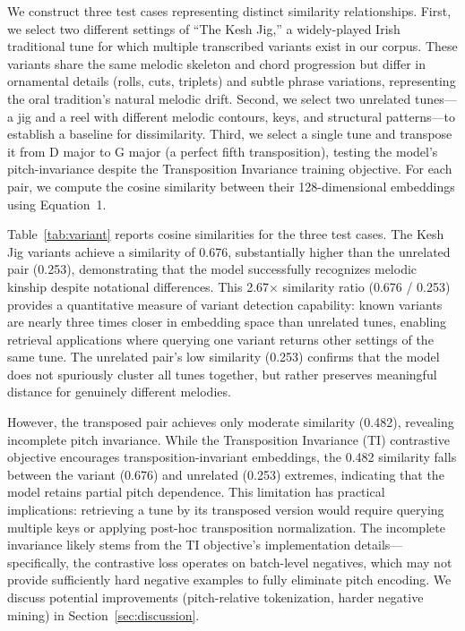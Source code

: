 \documentclass[]{interact}
\theoremstyle{plain}
\theoremstyle{definition}
\theoremstyle{remark}
\begin{document}
We construct three test cases representing distinct similarity relationships. First, we select two different settings of ``The Kesh Jig,'' a widely-played Irish traditional tune for which multiple transcribed variants exist in our corpus. These variants share the same melodic skeleton and chord progression but differ in ornamental details (rolls, cuts, triplets) and subtle phrase variations, representing the oral tradition's natural melodic drift. Second, we select two unrelated tunes---a jig and a reel with different melodic contours, keys, and structural patterns---to establish a baseline for dissimilarity. Third, we select a single tune and transpose it from D major to G major (a perfect fifth transposition), testing the model's pitch-invariance despite the Transposition Invariance training objective. For each pair, we compute the cosine similarity between their 128-dimensional embeddings using Equation~1.

Table~\ref{tab:variant} reports cosine similarities for the three test cases. The Kesh Jig variants achieve a similarity of 0.676, substantially higher than the unrelated pair (0.253), demonstrating that the model successfully recognizes melodic kinship despite notational differences. This 2.67$\times$ similarity ratio (0.676 / 0.253) provides a quantitative measure of variant detection capability: known variants are nearly three times closer in embedding space than unrelated tunes, enabling retrieval applications where querying one variant returns other settings of the same tune. The unrelated pair's low similarity (0.253) confirms that the model does not spuriously cluster all tunes together, but rather preserves meaningful distance for genuinely different melodies.

However, the transposed pair achieves only moderate similarity (0.482), revealing incomplete pitch invariance. While the Transposition Invariance (TI) contrastive objective encourages transposition-invariant embeddings, the 0.482 similarity falls between the variant (0.676) and unrelated (0.253) extremes, indicating that the model retains partial pitch dependence. This limitation has practical implications: retrieving a tune by its transposed version would require querying multiple keys or applying post-hoc transposition normalization. The incomplete invariance likely stems from the TI objective's implementation details---specifically, the contrastive loss operates on batch-level negatives, which may not provide sufficiently hard negative examples to fully eliminate pitch encoding. We discuss potential improvements (pitch-relative tokenization, harder negative mining) in Section~\ref{sec:discussion}.
\end{document}
